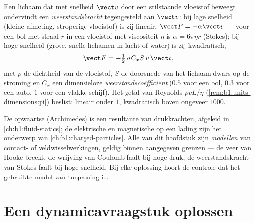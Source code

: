 \begin{proposition}[Vloeistofwrijving]\label{prop:b1:newton-dynamics:drag}
Een lichaam dat met snelheid $\vect v$ door een stilstaande vloeistof beweegt ondervindt een
\emph{weerstandskracht} tegengesteld aan $\vect v$: bij lage snelheid (kleine afmeting, stroperige
vloeistof) is zij lineair, $\vect F = -\alpha\vect v$ --- voor een bol met
straal $r$ in een vloeistof met viscositeit $\eta$ is $\alpha = 6\pi\eta r$
(Stokes); bij hoge snelheid (grote, snelle lichamen in lucht of water) is zij
kwadratisch,
\[
\vect F = -\tfrac12\,\rho\,C_xS\,v\,\vect v ,
\]
met $\rho$ de dichtheid van de vloeistof, $S$ de doorsnede van het lichaam dwars op
de stroming en $C_x$ een dimensieloze \emph{weerstandscoëfficiënt} ($0.5$ voor een
bol, $0.3$ voor een auto, $1$ voor een vlakke schijf). Het getal van Reynolds
$\rho vL/\eta$ (\cref{rem:b1:units-dimensions:pi}) beslist: lineair
onder $1$, kwadratisch boven ongeveer $1000$.
\end{proposition}
\admitted

\begin{remark}\label{rem:b1:newton-dynamics:others}
De opwaartse  (Archimedes) is een resultante van drukkrachten, afgeleid in
\cref{ch:b1:fluid-statics}; de elektrische en magnetische  op een
lading zijn het onderwerp van \cref{ch:b1:charged-particles}. Alle
 van dit hoofdstuk zijn \emph{modellen} van contact- of
veldwisselwerkingen, geldig binnen aangegeven grenzen --- de veer van Hooke breekt,
de wrijving van Coulomb faalt bij hoge druk, de weerstandskracht van Stokes faalt bij hoge
snelheid. Bij elke oplossing hoort de controle dat het gebruikte model van toepassing is.
\end{remark}

\section{Een dynamicavraagstuk oplossen}

